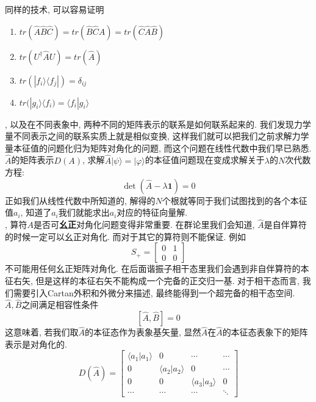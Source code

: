 \documentclass[a4paper,11pt]{book}
\newcommand{\A}{\hat{A}}
\newcommand{\B}{\hat{B}}
\newcommand{\hC}{\hat{C}}
\begin{document}
同样的技术, 可以容易证明
\begin{enumerate}[(1)]
  \item $tr(\A\B\hC)=tr(\B\hC\A)=tr(\hC\A\B)$
  \item $tr(U^\dag\A U)=tr(\A)$
  \item $tr(|f_i\rangle\langle f_j|)=\delta_{ij}$
  \item $tr(|g_i\rangle\langle f_i)=\langle f_i|g_i\rangle$
\end{enumerate}
, 以及在不同表象中, 两种不同的矩阵表示的联系是如何联系起来的. 我们发现力学量不同表示之间的联系实质上就是相似变换, 这样我们就可以把我们之前求解力学量本征值的问题化归为矩阵对角化的问题, 而这个问题在线性代数中我们早已熟悉. \\
$\A$的矩阵表示$D(A)$, 求解$\A|\psi\rangle=|\varphi\rangle$的本征值问题现在变成求解关于$\lambda$的$N$次代数方程:
\begin{equation*}
  \det(\A-\lambda\mathbf{1})=0
\end{equation*}
正如我们从线性代数中所知道的, 解得的$N$个根就等同于我们试图找到的各个本征值$a_i$, 知道了$a_i$我们就能求出$a_i$对应的特征向量解. \\
, 算符$A$是否可\textbf{幺正}对角化问题变得非常重要. 在群论里我们会知道, $\A$是自伴算符的时候一定可以幺正对角化. 而对于其它的算符则不能保证. 例如
\begin{equation*}
  S_{+}=\begin{bmatrix}
    0 & 1 \\
    0 & 0
  \end{bmatrix}
\end{equation*}
不可能用任何幺正矩阵对角化. 在后面谐振子相干态里我们会遇到非自伴算符的本征右矢, 但是这样的本征右矢不能构成一个完备的正交归一基. 对于相干态而言, 我们需要引入Cartan外积和外微分来描述, 最终能得到一个超完备的相干态空间.\\
$\A,\B$之间满足相容性条件
\begin{equation*}
  \left[\A,\B\right]=0
\end{equation*}
这意味着, 若我们取$\A$的本征态作为表象基矢量, 显然$\A$在$\A$的本征态表象下的矩阵表示是对角化的.
\begin{equation*}
  D(\A)=\begin{bmatrix}
          \langle a_1|a_1\rangle & 0 & \cdots & \cdots \\
          0 & \langle a_2|a_2\rangle & 0 & \cdots \\
          0 & 0 & \langle a_3|a_3\rangle & 0 \\
          \cdots & \cdots & \cdots & \ddots
        \end{bmatrix}
\end{equation*}
\end{document}
